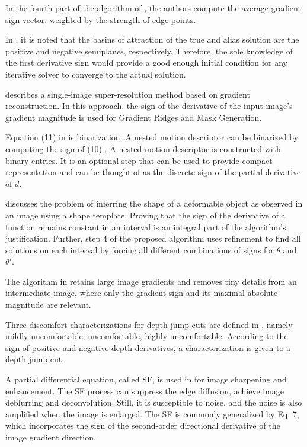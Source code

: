 \documentclass[11pt]{book}
\begin{document}
In the fourth part of the algorithm of \cite{mccloskey2014improved},
the authors compute the average gradient sign vector, weighted by
the strength of edge points.

In \cite{tani2014derivative}, it is noted that the basins of attraction
of the true and alias solution are the positive and negative semiplanes,
respectively. Therefore, the sole knowledge of the first derivative
sign would provide a good enough initial condition for any iterative
solver to converge to the actual solution.

\cite{zhu2015modeling} describes a single-image super-resolution
method based on gradient reconstruction. In this approach, the sign
of the derivative of the input image's gradient magnitude is used
for Gradient Ridges and Mask Generation.

Equation (11) in \cite{byrne2015nested} is binarization. A nested
motion descriptor can be binarized by computing the sign of (10) .
A nested motion descriptor is constructed with binary entries. It
is an optional step that can be used to provide compact representation
and can be thought of as the discrete sign of the partial derivative
of $d$.

\cite{gallardo2015shape} discusses the problem of inferring the shape
of a deformable object as observed in an image using a shape template.
Proving that the sign of the derivative of a function remains constant
in an interval is an integral part of the algorithm's justification.
Further, step 4 of the proposed algorithm uses refinement to find
all solutions on each interval by forcing all different combinations
of signs for $\theta$ and $\theta'$.

The algorithm in \cite{pan2016robust} retains large image gradients
and removes tiny details from an intermediate image, where only the
gradient sign and its maximal absolute magnitude are relevant.

Three discomfort characterizations for depth jump cuts are defined
in \cite{delis2016automatic}, namely \textquotedbl mildly uncomfortable\textquotedbl ,
\textquotedbl uncomfortable\textquotedbl , \textquotedbl highly uncomfortable\textquotedbl .
According to the sign of positive and negative depth derivatives,
a characterization is given to a depth jump cut.

A partial differential equation, called SF, is used in \cite{huang2017multi}
for image sharpening and enhancement. The SF process can suppress
the edge diffusion, achieve image deblurring and deconvolution. Still,
it is susceptible to noise, and the noise is also amplified when the
image is enlarged. The SF is commonly generalized by Eq. 7, which
incorporates the sign of the second-order directional derivative of
the image gradient direction.
\end{document}
